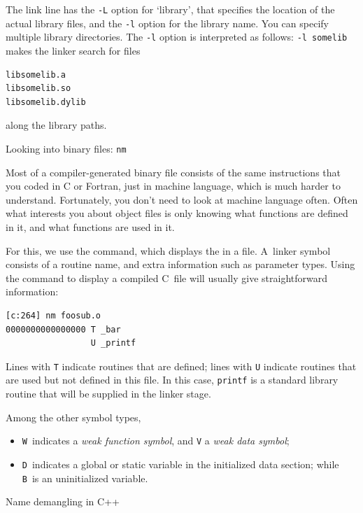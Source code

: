 The link line has the \lstinline{-L} option for `library',
that specifies the location of the actual library files,
and the \lstinline{-l} option for the library name.
You can specify multiple library directories.
The \lstinline{-l} option is interpreted as follows:
\lstinline{-l somelib} makes the linker search for files
\begin{lstlisting}
libsomelib.a
libsomelib.so
libsomelib.dylib
\end{lstlisting}
along the library paths.



 {Looking into binary files: \texttt{nm}}
\label{sec:nm-dot-o}

Most of a compiler-generated binary file consists of the same instructions that you
coded in C or Fortran, just in machine language, which
is much harder to understand.
Fortunately, you don't need to look at machine language often.
Often what interests you about object files is only knowing
what functions are defined in it, and what functions are used in it.

For this, we use the  command,
which displays the 
in a file.
A~linker symbol consists of a routine name,
and extra information such as parameter types.
Using the  command to display a compiled C~file
will usually give straightforward information:
\begin{lstlisting}
[c:264] nm foosub.o
0000000000000000 T _bar
                 U _printf
\end{lstlisting}
Lines with \lstinline{T} indicate routines that are defined; lines with \lstinline{U}
indicate routines that are used but not defined in this file. In this
case, \lstinline{printf} is a standard library routine that will be supplied in the
linker stage.

Among the other symbol types,
\begin{itemize}
\item \lstinline{W}~indicates a
  \emph{weak function symbol},
  and \lstinline{V} a
  \emph{weak data symbol};
\item
  \lstinline{D}~indicates a global or static variable
  in the initialized data section;
  while \lstinline{B}~is an uninitialized variable.
\end{itemize}

 {Name demangling in C++}
\label{sec:cpp-mangle}

